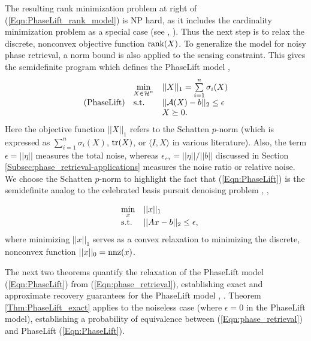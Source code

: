 The resulting rank minimization problem at right of (\ref{Eqn:PhaseLift_rank_model}) is NP hard, as it includes the cardinality minimization problem as a special case (see \cite{natarajan1995sparse}, \cite{recht2010guaranteed}).  Thus the next step is to relax the discrete, nonconvex objective function $\textnormal{rank}(X)$.  To generalize the model for noisy phase retrieval, a norm bound is also applied to the sensing constraint.  This gives the semidefinite program which defines the PhaseLift model \cite{DBLP:journals/siamis/CandesESV13}, \cite{candes2013phaselift}
\begin{equation} \label{Eqn:PhaseLift}
\begin{array}{lll}
	&	\min\limits_{\substack{X \in {\mathcal H}^n}}
		&	||X||_1 = \sum\limits_{\substack{i=1}}^{\substack{n}} \sigma_i(X)
			\\
\textnormal{(PhaseLift)}
	&	\textnormal{s.t.}
		& 	||{\mathcal A} (X) - b||_2 \leq \epsilon
			\\

	&
		&	X \succeq 0.

\end{array}
\end{equation}
Here the objective function $||X||_1$ refers to the Schatten $p$-norm (which is expressed as $\sum_{i=1}^n \sigma_i(X)$, $\mathrm{tr}(X)$, or $\langle I, X \rangle$ in various literature).  Also, the term $\epsilon = ||\eta||$ measures the total noise, whereas $\epsilon_\rel = ||\eta|| / ||b||$ discussed in Section \ref{Subsec:phase_retrieval-applications} measures the noise ratio or relative noise.  We choose the Schatten $p$-norm to highlight the fact that (\ref{Eqn:PhaseLift}) is the semidefinite analog to the celebrated  basis pursuit denoising problem \cite{chen2001atomic}, \cite{candes2006stable},

\begin{equation}  			\label{Eqn:basis_pursuit}
\begin{array}{lll}
	&	\min\limits_{\substack{x}}
		&	||x||_1
			\\
	&	\textnormal{s.t.}
		&	||Ax-b||_2 \leq \epsilon,
\end{array}
\end{equation}
where minimizing $||x||_1$ serves as a convex relaxation to minimizing the discrete, nonconvex function $||x||_0 = \textnormal{nnz}(x)$.



The next two theorems quantify the relaxation of the PhaseLift model (\ref{Eqn:PhaseLift}) from (\ref{Eqn:phase_retrieval}), establishing exact and approximate recovery guarantees for the PhaseLift model \cite{candes2014solving}, \cite{candes2013phaselift}.  Theorem \ref{Thm:PhaseLift_exact} applies to the noiseless case (where $\epsilon = 0$ in the PhaseLift model), establishing a probability of equivalence between (\ref{Eqn:phase_retrieval}) and PhaseLift (\ref{Eqn:PhaseLift}).  


